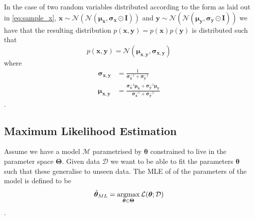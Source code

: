 In the case of two random variables distributed according to the form as laid
out in \eqref{eq:sample_x}, $\bm{x} \sim
\mathcal{N}(\mathcal{N}(\bm{\mu}_{\bm{x}}, \bm{\sigma}_{\bm{x}} \odot \bm{I}))$
and $\bm{y} \sim \mathcal{N}(\mathcal{N}(\bm{\mu}_{\bm{y}}, \bm{\sigma}_{\bm{y}}
\odot \bm{I}))$ we have that the resulting distribution $p(\bm{x}, \bm{y}) =
p(\bm{x})p(\bm{y})$ is distributed such that
\begin{equation*}
  p(\bm{x}, \bm{y}) = \mathcal{N}(\bm{\mu}_{\bm{x}, \bm{y}}, \bm{\sigma}_{\bm{x}, \bm{y}})
\end{equation*}
where
\begin{align}
  \bm{\sigma}_{\bm{x}, \bm{y}} & = \frac{1}{\bm{\sigma}_{\bm{x}}^{-1} + \bm{\sigma}_{\bm{y}}^{-1}} \label{eq:joint_indep_normal_covariance_diag}\\
  \bm{\mu}_{\bm{x}, \bm{y}} & = \frac{\bm{\sigma}_{\bm{x}}^{-1}\bm{\mu}_{\bm{x}} + \bm{\sigma}_{\bm{y}}^{-1}\bm{\mu}_{\bm{y}}}{\bm{\sigma}_{\bm{x}}^{-1} + \bm{\sigma}_{\bm{y}}^{-1}} \label{eq:joint_indep_normal_mean_diag}
\end{align}.

\subsection{Maximum Likelihood Estimation}

Assume we have a model $\mathcal{M}$ parametrised by $\bm{\theta}$ constrained
to live in the parameter space $\bm{\Theta}$. Given data $\mathcal{D}$ we want
to be able to fit the parameters $\bm{\theta}$ such that these generalise to
unseen data. The MLE of of the parameters of the model is defined to be
\begin{equation}
  \label{eq:MLE}
  \hat{\bm{\theta}}_{ML} = \operatorname*{\arg\!\max}_{\bm{\theta} \in \bm{\Theta}}\mathcal{L}(\bm{\theta}; \mathcal{D})
\end{equation}
.

